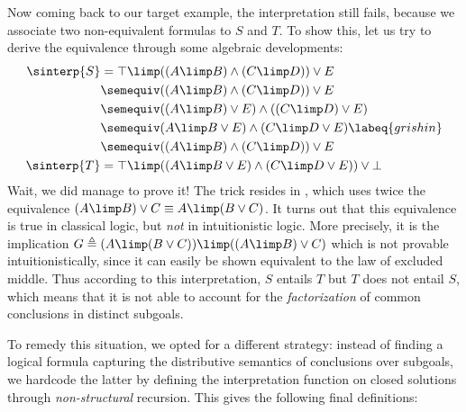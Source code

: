 Now coming back to our target example,
the interpretation still fails, because we associate two non-equivalent
formulas to $S$ and $T$. To show this, let us try to derive the equivalence
through some algebraic developments:
\begin{align}
  \sinterp{S} &= \top \limp ((A \limp B) \land (C \limp D)) \lor E \nonumber\\
              &\semequiv ((A \limp B) \land (C \limp D)) \lor E \nonumber\\
              &\semequiv ((A \limp B) \lor E) \land ((C \limp D) \lor E) \nonumber\\
              &\semequiv (A \limp B \lor E) \land (C \limp D \lor E) \labeq{grishin}\\
              &\semequiv ((A \limp B) \land (C \limp D)) \lor E \nonumber\\
  \sinterp{T} &= \top \limp ((A \limp B \lor E) \land (C \limp D \lor E)) \lor \bot \nonumber
\end{align}
Wait, we did manage to prove it! The trick resides in , which
uses twice the equivalence $(A \limp B) \lor C \equiv A \limp (B \lor C)$. It
turns out that this equivalence is true in classical logic, but \emph{not} in
intuitionistic logic. More precisely, it is the implication $G \triangleq (A
\limp (B \lor C)) \limp ((A \limp B) \lor C)$ which is not provable
intuitionistically, since it can easily be shown equivalent to the law of
excluded middle. Thus according to this interpretation, $S$
entails $T$ but $T$ does not entail $S$, which means that it is not able to
account for the \emph{factorization} of common conclusions in distinct subgoals.

To remedy this situation, we opted for a different strategy: instead of finding
a logical formula capturing the distributive semantics of conclusions over
subgoals, we hardcode the latter by defining the interpretation function on
closed solutions through \emph{non-structural} recursion. This gives the
following final definitions:


